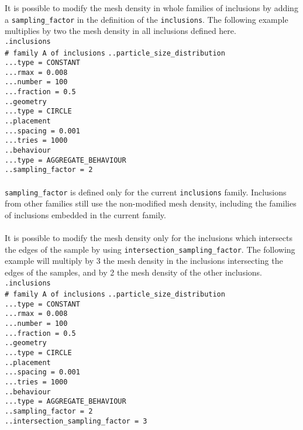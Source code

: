\documentclass[10pt]{article}
\begin{document}
It is possible to modify the mesh density in whole families of inclusions by adding a \verb+sampling_factor+ in the definition of the \verb+inclusions+. The following example multiplies by two the mesh density in all inclusions defined here.\\

\noindent \verb+.inclusions+\\
\verb+# family A of inclusions+
\verb+..particle_size_distribution+\\
\verb+...type = CONSTANT+\\
\verb+...rmax = 0.008+\\
\verb+...number = 100+\\
\verb+...fraction = 0.5+\\
\verb+..geometry+\\
\verb+...type = CIRCLE+\\
\verb+..placement+\\
\verb+...spacing = 0.001+\\
\verb+...tries = 1000+\\
\verb+..behaviour+\\
\verb+...type = AGGREGATE_BEHAVIOUR+\\
\verb+..sampling_factor = 2+

\paragraph{} \verb+sampling_factor+ is defined only for the current \verb+inclusions+ family. Inclusions from other families still use the non-modified mesh density, including the families of inclusions embedded in the current family.

\paragraph{} It is possible to modify the mesh density only for the inclusions which intersects the edges of the sample by using \verb+intersection_sampling_factor+. The following example will multiply by 3 the mesh density in the inclusions intersecting the edges of the samples, and by 2 the mesh density of the other inclusions.\\

\noindent \verb+.inclusions+\\
\verb+# family A of inclusions+
\verb+..particle_size_distribution+\\
\verb+...type = CONSTANT+\\
\verb+...rmax = 0.008+\\
\verb+...number = 100+\\
\verb+...fraction = 0.5+\\
\verb+..geometry+\\
\verb+...type = CIRCLE+\\
\verb+..placement+\\
\verb+...spacing = 0.001+\\
\verb+...tries = 1000+\\
\verb+..behaviour+\\
\verb+...type = AGGREGATE_BEHAVIOUR+\\
\verb+..sampling_factor = 2+\\
\verb+..intersection_sampling_factor = 3+
\end{document}
